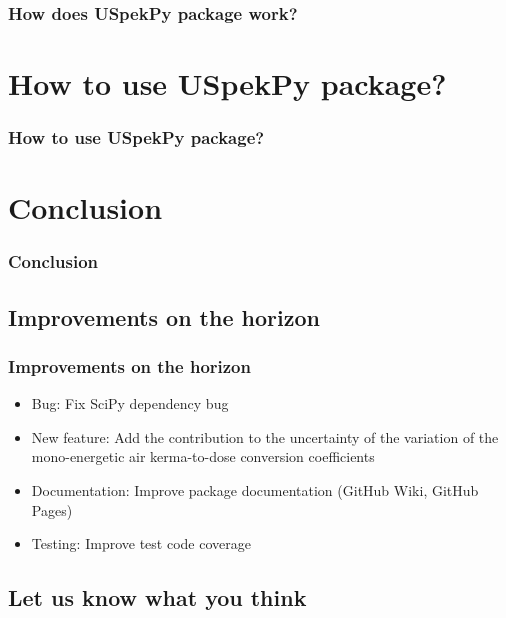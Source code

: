 \documentclass{beamer}
\newcommand{\highlight}[1]{{\color{blue} #1}}
\begin{document}
	\begin{frame}
		\frametitle{How does USpekPy package work?}
		\tableofcontents[
		currentsection,
		sectionstyle=show/shaded,
		subsectionstyle=show/show/hide
		]
	\end{frame}
	
	\section{How to use USpekPy package?}
	
	\begin{frame}
		\frametitle{How to use USpekPy package?}
		\tableofcontents[
		currentsection,
		sectionstyle=show/shaded,
		subsectionstyle=show/show/hide
		]
	\end{frame}
	
	\section{Conclusion}
		
	\begin{frame}
		\frametitle{Conclusion}
		\tableofcontents[
		currentsection,
		sectionstyle=show/shaded,
		subsectionstyle=show/show/hide
		]
	\end{frame}
	
	\subsection{Improvements on the horizon}
	
	\begin{frame}
		\frametitle{Improvements on the horizon}
		\begin{itemize}
			\setlength\itemsep{1em}
			\item \highlight{Bug}: Fix SciPy dependency bug
			\item \highlight{New feature}: Add the contribution to the \highlight{uncertainty} of the variation of the mono-energetic air kerma-to-dose conversion coefficients
			\item \highlight{Documentation}: Improve package documentation (GitHub Wiki, GitHub Pages)
			\item \highlight{Testing}: Improve test code coverage
		\end{itemize}			
	\end{frame}
	
	\subsection{Let us know what you think}
	
\end{document}
